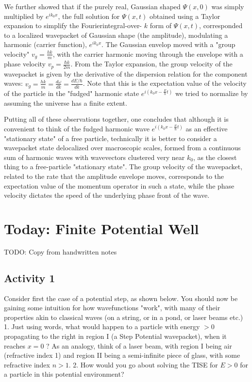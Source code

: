 \documentclass{article}
\begin{document}
We further showed that if the purely real, Gaussian shaped $\Psi(x, 0)$ was simply multiplied by $e^{i k_{0} x}$, the full solution for $\Psi(x, t)$ obtained using a Taylor expansion to simplify the Fourierintegral-over- $k$ form of $\Psi(x, t)$, corresponded to a localized wavepacket of Gaussian shape (the amplitude), modulating a harmonic (carrier function), $e^{i k_{0} x}$. The Gaussian envelop moved with a "group velocity" $v_{g}=\frac{h k}{m}$, with the carrier harmonic moving through the envelope with a phase velocity $v_{p}=\frac{\hbar k}{2 m}$. From the Taylor expansion, the group velocity of the wavepacket is given by the derivative of the dispersion relation for the component waves: $v_{g}=\frac{h k}{m}=\frac{d \omega}{d k}=\frac{d E / \hbar}{d k}$. Note that this is the expectation value of the velocity of the particle in the "fudged" harmonic state $e^{i\left(k_{0} x-\frac{E}{h} t\right)}$ we tried to normalize by assuming the universe has a finite extent.

Putting all of these observations together, one concludes that although it is convenient to think of the fudged harmonic wave $e^{i\left(k_{0} x-\frac{E}{\hbar} t\right)}$ as an effective "stationary state" of a free particle, technically it is better to consider a wavepacket state delocalized over macroscopic scales, formed from a continuous sum of harmonic waves with wavevectors clustered very near $k_{0}$, as the closest thing to a free-particle "stationary state". The group velocity of the wavepacket, related to the rate that the amplitude envelope moves, corresponds to the expectation value of the momentum operator in such a state, while the phase velocity dictates the speed of the underlying phase front of the wave.

\section{Today: Finite Potential Well}

TODO: Copy from handwritten notes

\subsection{Activity 1}

Consider first the case of a potential step, as shown below. You should now be gaining some intuition for how wavefunctions "work", with many of their properties akin to classical waves (on a string, or in a pond, or laser beams etc.)
1. Just using words, what would happen to a particle with energy $>0$ propagating to the right in region I (a Step Potential wavepacket), when it reaches $x=0$ ? As an analogy, think of a laser beam, with region I being air (refractive index 1) and region II being a semi-infinite piece of glass, with some refractive index $n>1$.
2. How would you go about solving the TISE for $E>0$ for a particle in this potential environment?
\end{document}
